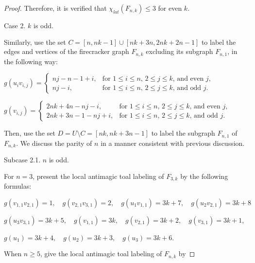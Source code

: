 \documentclass[12pt]{article}
\begin{document}
\begin{proof}
Therefore, it is verified that $\chi_{lat}(F_{n,k})\leq 3$ for even $k$.

Case 2. $k$ is odd.

Similarly, use the set $C=[n,nk-1]\cup[nk+3n,2nk+2n-1]$ to label the edges and vertices of the firecracker graph $F_{n,k}$ excluding its subgraph $F_{n,1}$, in the following way:\\
\vspace{0.5em}

$g(u_{i}v_{i,j})=\begin{cases}
     nj-n-1+i, & \text{for $1\leq i\leq n$, $2\leq j\leq k$, and even $j$}, \\
     nj-i, & \text{for $1\leq i\leq n$, $2\leq j\leq k$, and odd $j$}. \end{cases}$\vspace{0.5em}

$ g(v_{i,j})=\begin{cases}
     2nk+4n-nj-i, & \text{for $1\leq i\leq n$, $2\leq j\leq k$, and even $j$}, \\
     2nk+3n-1-nj+i, & \text{for $1\leq i\leq n$, $2\leq j\leq k$, and odd $j$}. \end{cases}$\vspace{0.5em}

Then, use the set $D=U\setminus C=[nk,nk+3n-1]$ to label the subgraph $F_{n,1}$ of $F_{n,k}$. We discuss the parity of $n$ in a manner consistent with previous discussion.

Subcase 2.1. $n$ is odd.

For $n=3$,  present the local antimagic toal labeling of $F_{3,k}$ by the following formulas:

$g(v_{1,1}v_{2,1})=1,\hspace{1em}g(v_{2,1}v_{3,1})=2,\hspace{1em}g(u_{1}v_{1,1})=3k+7,\hspace{1em}g(u_{2}v_{2,1})=3k+8$

$g(u_{3}v_{3,1})=3k+5,\hspace{1em}g(v_{1,1})=3k,\hspace{1em}g(v_{2,1})=3k+2,\hspace{1em}g(v_{3,1})=3k+1$,

$g(u_{1})=3k+4,\hspace{1em}g(u_{2})=3k+3,\hspace{1em}g(u_{3})=3k+6$.

When $n\geq 5$, give the local antimagic toal labeling of $F_{n,k}$ by\vspace{0.6em}


\end{proof}
\end{document}

